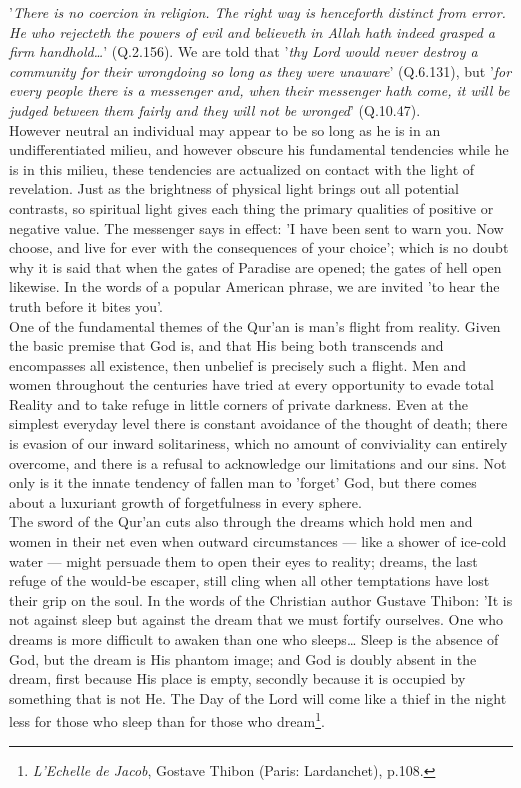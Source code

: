 \documentclass[11pt, b5paper, twoside]{book}
\begin{document}
'\emph{There is no coercion in religion. The right way is henceforth distinct from error. He who rejecteth 
the powers of evil and believeth in Allah hath indeed grasped a firm handhold\ldots{}}' (Q.2.156). We are 
told that '\emph{thy Lord would never destroy a community for their wrongdoing so long as they were 
unaware}' (Q.6.131), but '\emph{for every people there is a messenger and, when their messenger hath come, it will be judged between them fairly and they will not be wronged}' (Q.10.47). \\

However neutral an individual may appear to be so long as he is in an undifferentiated milieu, and 
however obscure his fundamental tendencies while he is in this milieu, these tendencies are 
actualized on contact with the light of revelation. Just as the brightness of physical light brings 
out all potential contrasts, so spiritual light gives each thing the primary qualities of positive or 
negative value. The messenger says in effect: 'I have been sent to warn you. Now choose, and live for 
ever with the consequences of your choice'; which is no doubt why it is said that when the gates of 
Paradise are opened; the gates of hell open likewise. In the words of a popular American phrase, we 
are invited 'to hear the truth before it bites you'. \\

One of the fundamental themes of the Qur'an is man's flight from reality. Given the basic premise 
that God is, and that His being both transcends and encompasses all existence, then unbelief is 
precisely such a flight. Men and women throughout the centuries have tried at every opportunity to 
evade total Reality and to take refuge in little corners of private darkness. Even at the simplest 
everyday level there is constant avoidance of the thought of death; there is evasion of our inward 
solitariness, which no amount of conviviality can entirely overcome, and there is a refusal to 
acknowledge our limitations and our sins. Not only is it the innate tendency of fallen man to 
'forget' God, but there comes about a luxuriant growth of forgetfulness in every sphere. \\

The sword of the Qur'an cuts also through the dreams which hold men and women in their net even when 
outward circumstances --- like a shower of ice-cold water --- might persuade them to open their eyes to 
reality; dreams, the last refuge of the would-be escaper, still cling when all other temptations have 
lost their grip on the soul. In the words of the Christian author Gustave Thibon: 'It is not against 
sleep but against the dream that we must fortify ourselves. One who dreams is more difficult to 
awaken than one who sleeps\ldots{} Sleep is the absence of God, but the dream is His phantom image; and God is doubly absent in the dream, first because His place is empty, secondly because it is occupied 
by something that is not He. The Day of the Lord will come like a thief in the night less for those 
who sleep than for those who dream\footnote{\emph{L'Echelle de Jacob}, Gostave Thibon (Paris: Lardanchet), p.108.}.\\
\end{document}
